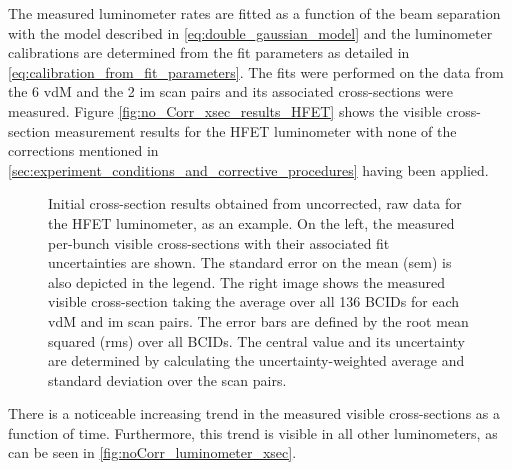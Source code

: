 The measured luminometer rates are fitted as a function of the beam separation with the model described in \autoref{eq:double_gaussian_model} and the luminometer calibrations are determined from the fit parameters as detailed in \autoref{eq:calibration_from_fit_parameters}. The fits were performed on the data from the 6 vdM and the 2 im scan pairs and its associated cross-sections were measured. Figure \autoref{fig:no_Corr_xsec_results_HFET} shows the visible cross-section measurement results for the HFET luminometer with none of the corrections mentioned in \autoref{sec:experiment_conditions_and_corrective_procedures} having been applied.

\begin{figure}[!htb]
	\centering
	\caption[Initial HFET cross-section results]{Initial cross-section results obtained from uncorrected, raw data for the HFET luminometer, as an example. On the left, the measured per-bunch visible cross-sections with their associated fit uncertainties are shown. The standard error on the mean (sem) is also depicted in the legend. The right image shows the measured visible cross-section taking the average over all 136 BCIDs for each vdM and im scan pairs. The error bars are defined by the root mean squared (rms) over all BCIDs. The central value and its uncertainty are determined by calculating the uncertainty-weighted average and  standard deviation over the scan pairs.}
	\label{fig:no_Corr_xsec_results_HFET}
\end{figure}

There is a noticeable increasing trend in the measured visible cross-sections as a function of time. Furthermore, this trend is visible in all other luminometers, as can be seen in \autoref{fig:noCorr_luminometer_xsec}.

